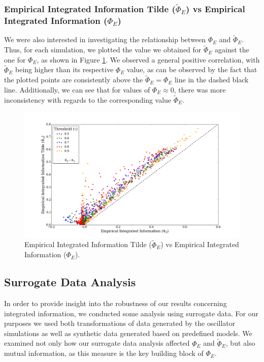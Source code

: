 \documentclass[a4paper,11pt]{article}
\begin{document}
\subsubsection{Empirical Integrated Information Tilde ($\widetilde{\Phi}_{E}$) vs Empirical Integrated Information ($\Phi_{E}$)}

We were also interested in investigating the relationship between $\Phi_{E}$ and $\widetilde{\Phi}_{E}$. Thus, for each simulation, we plotted the value we obtained for $\widetilde{\Phi}_{E}$ against the one for $\Phi_E$, as shown in Figure \ref{fig:phi-tilde-vs-phi}. We observed a general positive correlation, with $\widetilde{\Phi}_{E}$ being higher than its respective $\Phi_E$ value, as can be observed by the fact that the plotted points are consistently above the $\widetilde{\Phi}_{E} = \Phi_E$ line in the dashed black line. Additionally, we can see that for values of $\Phi_E \approx 0$, there was more inconsistency with regards to the corresponding value $\widetilde{\Phi}_{E}$.

\begin{figure}[H]
\begin{center}
\includegraphics[scale = 0.35]{figures/phi_tilde_vs_phi}
\caption{
	Empirical Integrated Information Tilde ($\widetilde{\Phi}_E$) vs Empirical Integrated Information ($\Phi_E$).
	\label{fig:phi-tilde-vs-phi}
}
\end{center}
\end{figure}

\subsection{Surrogate Data Analysis}
\label{sec:app:osc:surrogate}

In order to provide insight into the robustness of our results concerning integrated information, we conducted some analysis using surrogate data. For our purposes we used both transformations of data generated by the oscillator simulations as well as synthetic data generated based on predefined models. We examined not only how our surrogate data analysis affected $\Phi_E$ and $\widetilde{\Phi}_E$, but also mutual information, as this measure is  the key building block of $\Phi_E$.
\end{document}
